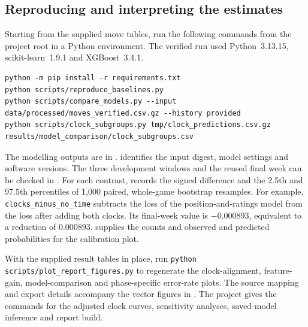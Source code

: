 \subsection{Reproducing and interpreting the estimates}
Starting from the supplied move tables, run the following commands from the project root in a Python environment. The verified run used Python~3.13.15, scikit-learn~1.9.1 and XGBoost~3.4.1.
{\small
\begin{verbatim}
python -m pip install -r requirements.txt
python scripts/reproduce_baselines.py
python scripts/compare_models.py --input data/processed/moves_verified.csv.gz --history provided
python scripts/clock_subgroups.py tmp/clock_predictions.csv.gz results/model_comparison/clock_subgroups.csv
\end{verbatim}
}
The modelling outputs are in .
 identifies the input digest, model settings and software versions. The three development windows and the reused final week can be checked in . For each contrast,  records the signed difference and the 2.5th and 97.5th percentiles of 1,000 paired, whole-game bootstrap resamples. For example, \texttt{clocks\_minus\_no\_time} subtracts the loss of the position-and-ratings model from the loss after adding both clocks. Its final-week value is \(-0.000893\), equivalent to a reduction of \(0.000893\).  supplies the counts and observed and predicted probabilities for the calibration plot.

With the supplied result tables in place, run \texttt{python scripts/plot\_report\_figures.py} to regenerate the clock-alignment, feature-gain, model-comparison and phase-specific error-rate plots. The source mapping and export details accompany the vector figures in . The project  gives the commands for the adjusted clock curves, sensitivity analyses, saved-model inference and report build.

